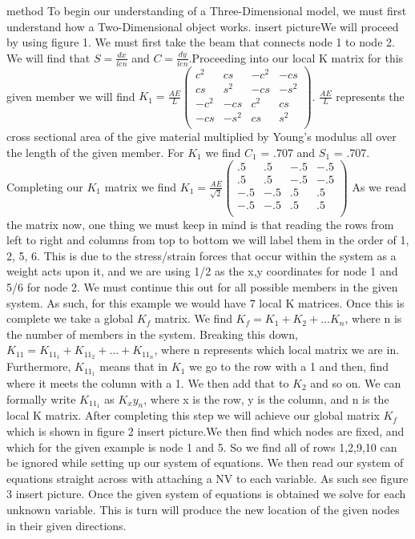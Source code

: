 \documentclass[final]{beamer}
\newlength{\twocolwid}
\begin{document}
\begin{frame}[t]
\begin{columns}[t]
\begin{column}{\twocolwid}
\begin{block}{method}
To begin our understanding of a Three-Dimensional model, we must first understand how a Two-Dimensional object works. {insert picture}We will proceed by using figure 1. We must first take the beam that connects node 1 to node 2. We will find that $S = \frac{dx}{len}$ and  $C = \frac{dy}{len}$.Proceeding into our local K matrix for this given member we will find $K_1 = \frac{A E}{L}
$$
\begin{pmatrix}
c^2 & cs & -c^2 & -cs\\
cs & s^2 & -cs & -s^2\\
-c^2 & -cs & c^2 & cs\\
-cs & -s^2 & cs & s^2\\
\end{pmatrix}
$$
$.
$\frac{A E}{L}$ represents the cross sectional area of the give material multiplied by Young's modulus all over the length of the given member. For $K_1$ we find $C_1$ = .707 and $S_1$ = .707. 
Completing our $K_1$ matrix we find $K_1 = \frac{A E}{\sqrt{2}}
$$
\begin{pmatrix}
.5 & .5 & -.5 &-.5\\
.5 & .5 & -.5 &-.5\\
-.5 & -.5 & .5 &.5\\
-.5 & -.5 & .5 &.5\\
\end{pmatrix}
$$
$
As we read the matrix now, one thing we must keep in mind is that reading the rows from left to right and columns from top to bottom we will label them in the order of 1, 2, 5, 6. This is due to the stress/strain forces that occur within the system as a weight acts upon it, and we are using 1/2 as the x,y coordinates for node 1 and 5/6 for node 2. We must continue this out for all possible members in the given system. As such, for this example we would have 7 local K matrices. Once this is complete we take a global $K_f$ matrix. We find $K_f = K_1 + K_2 + ... K_n$, where n is the number of members in the system. Breaking this down, $K_11 = K_11_1 + K_11_2+...+K_11_n$, where n represents which local matrix we are in. Furthermore, $K_11_1$ means that in $K_1$ we go to the row with a 1 and then, find where it meets the column with a 1. We then add that to $K_2$ and so on. We can formally write $K_11_1$
as $K_xy_n$, where x is the row, y is the column, and n is the local K matrix. After completing this step we will achieve our global matrix $K_f$ which is shown in figure 2 {insert picture}.We then find which nodes are fixed, and which for the given example is node 1 and 5. So we find all of rows 1,2,9,10 can be ignored while setting up our system of equations. We then read our system of equations straight across with attaching a NV to each variable. As such see figure 3 {insert picture}. Once the given system of equations is obtained we solve for each unknown variable. This is turn will produce the new location of the given nodes in their given directions. 




\end{block}
\end{column}
\end{columns}
\end{frame}
\end{document}
